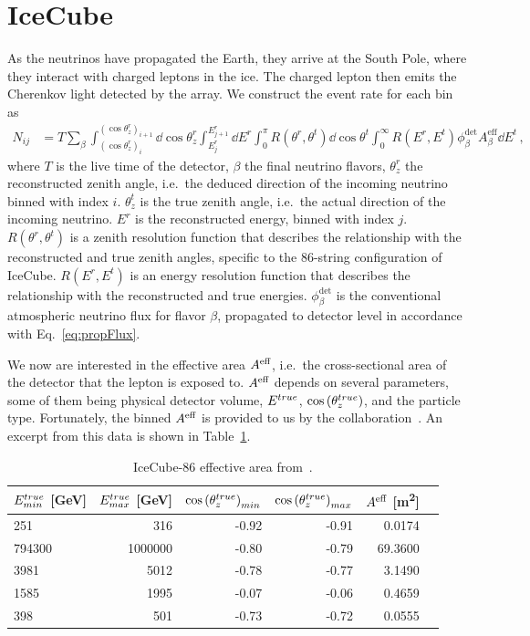 \section{IceCube}\label{ch:ICmethod}
As the neutrinos have propagated the Earth, they arrive at the South Pole, where they interact with charged leptons in the ice. The charged lepton then emits the Cherenkov light detected by the array.
We construct the event rate for each bin as
\begin{align}\label{eq:ICevents}
    N_{ij} &= T \sum_\beta\int_{(\cos{\theta_z^r})_i}^{(\cos{\theta_z^r})_{i+1}} \dd \cos{\theta^r_z} \int_{E^r_{j}}^{E^r_{j+1}} \dd E^r 
    \int_0^\pi R(\theta^r,\theta^t) \dd \cos{\theta^t} \int_0^\infty R(E^r,E^t) \phi_\beta^\text{det}  A^\text{eff}_\beta \dd E^t
    \,,
\end{align}
where $T$ is the live time of the detector, $\beta$ the final neutrino flavors, $\theta_z^r$ the reconstructed 
zenith angle, i.e.~the deduced direction of the incoming neutrino binned with index $i$. $\theta^t_z$ is the true zenith angle, i.e.~the actual direction of the incoming neutrino. 
$E^r$ is the reconstructed energy, binned with index $j$. $R(\theta^r,\theta^t)$ is a zenith resolution function 
that describes the relationship with the reconstructed and true zenith angles, specific to the 86-string configuration of IceCube.
$R(E^r,E^t)$ is an energy resolution function 
that describes the relationship with the reconstructed and true energies. $\phi_\beta^\text{det}$ is the conventional atmospheric neutrino flux for flavor $\beta$, propagated to detector level
in accordance with Eq.~\ref{eq:propFlux}.

We now are interested in the effective area $A^\text{eff}$, 
i.e.~the cross-sectional area of the detector that the lepton is exposed to.
$A^\text{eff}$ depends on several parameters, some of them being physical detector volume, $E^{true}$, $\cos{(\theta_z^{true})}$, and the particle type. 
Fortunately, the binned $A^\text{eff}$ is provided to us by the collaboration~\cite{ICaeff}.
An excerpt from this data is shown in Table~\ref{table:aeff}.

\begin{table}[ht]
    \centering
    \begin{tabular}{lrrrrr}
        \hline \hline
        $E^{true}_{min}$ [\si{\GeV}] &     $E^{true}_{max}$ [\si{\GeV}]&   $\cos{(\theta_z^{true})}_{min}$ &   $\cos{(\theta_z^{true})}_{max}$ &     $A^\text{eff}$ [\si{\metre\squared}] \\
        \hline
             251 &      316 &  -0.92 &  -0.91 &   0.0174 \\
          794300 &  1000000 &  -0.80 &  -0.79 &  69.3600 \\
            3981 &     5012 &  -0.78 &  -0.77 &   3.1490 \\
            1585 &     1995 &  -0.07 &  -0.06 &   0.4659 \\
            398 &      501 &  -0.73 &  -0.72 &   0.0555 \\
        \hline \hline
        \end{tabular}
    \caption{IceCube-86 effective area from~\cite{ICaeff}.}
    \label{table:aeff}
\end{table}

